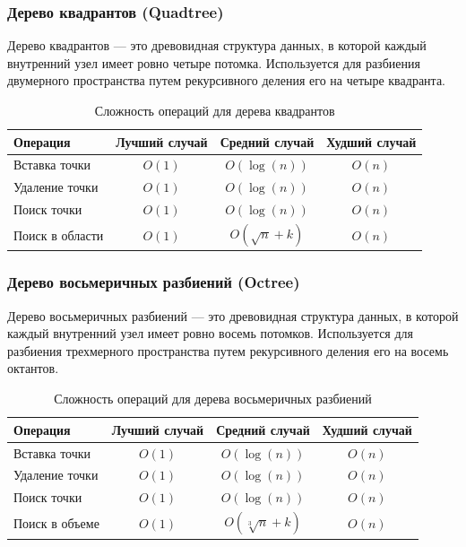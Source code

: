\documentclass[a4paper,12pt]{article}
\begin{document}
\subsubsection{Дерево квадрантов (Quadtree)}
\label{subsubsec:дерево-квадрантов-quadtree}

Дерево квадрантов --- это древовидная структура данных, в которой каждый внутренний узел имеет ровно четыре потомка. Используется для разбиения двумерного пространства путем рекурсивного деления его на четыре квадранта.

\begin{table}[H]
    \centering
    \begin{tabular}{|l|c|c|c|}
        \hline
        Операция & Лучший случай & Средний случай & Худший случай \\
        \hline
        Вставка точки & $O(1)$ & $O(\log(n))$ & $O(n)$ \\
        \hline
        Удаление точки & $O(1)$ & $O(\log(n))$ & $O(n)$ \\
        \hline
        Поиск точки & $O(1)$ & $O(\log(n))$ & $O(n)$ \\
        \hline
        Поиск в области & $O(1)$ & $O(\sqrt{n} + k)$ & $O(n)$ \\
        \hline
    \end{tabular}
    \caption{Сложность операций для дерева квадрантов}
\end{table}

\subsubsection{Дерево восьмеричных разбиений (Octree)}
\label{subsubsec:дерево-восьмеричных-разбиений-octree}

Дерево восьмеричных разбиений --- это древовидная структура данных, в которой каждый внутренний узел имеет ровно восемь потомков. Используется для разбиения трехмерного пространства путем рекурсивного деления его на восемь октантов.

\begin{table}[H]
    \centering
    \begin{tabular}{|l|c|c|c|}
        \hline
        Операция & Лучший случай & Средний случай & Худший случай \\
        \hline
        Вставка точки & $O(1)$ & $O(\log(n))$ & $O(n)$ \\
        \hline
        Удаление точки & $O(1)$ & $O(\log(n))$ & $O(n)$ \\
        \hline
        Поиск точки & $O(1)$ & $O(\log(n))$ & $O(n)$ \\
        \hline
        Поиск в объеме & $O(1)$ & $O(\sqrt[3]{n} + k)$ & $O(n)$ \\
        \hline
    \end{tabular}
    \caption{Сложность операций для дерева восьмеричных разбиений}
\end{table}
\end{document}
